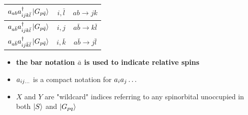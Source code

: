 \documentclass[./thesis.tex]{subfiles}
\begin{document}
\begin{table}
\begin{center}
\begin{tabular}{ c|c|c }
		\hline \rule{0pt}{3ex}
		$a_{ab} a^\dagger_{ijk \bar l} \ket {G_{p \bar q}}$			&$i,\bar l$		&$ab \rightarrow jk$		\\
		\hline \rule{0pt}{3ex}
		$a_{a  \bar b} a^\dagger_{ijk \bar l} \ket {G_{p \bar q}}$			&$i,j$		&$a \bar b \rightarrow k \bar l$		\\
		\hline \rule{0pt}{3ex}
		$a_{a  \bar b} a^\dagger_{ij \bar k \bar l} \ket {G_{p \bar q}}$			&$i,\bar k$		&$a \bar b \rightarrow j \bar l$		\\
	\end{tabular}
	
\end{center}
\begin{itemize}
\item
\textbf{the bar notation $\bar a$ is used to indicate relative spins}
\item
$a_{ij\ldots}$ is a compact notation for $a_{i} a_{j} \ldots$
\item
$X$ and $Y$ are "wildcard" indices referring to any spinorbital unoccupied in both $\ket S$ and $\ket {G_{pq}}$ 
\end{itemize}
\end{table}
\end{document}
